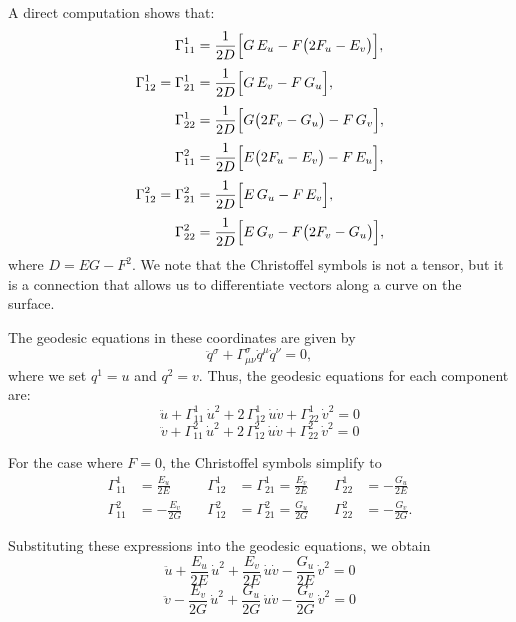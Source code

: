 \documentclass[12pt]{article}
\begin{document}
A direct computation shows that:
\[
\begin{aligned}
\Gamma^1_{11} &= \frac{1}{2D}\Bigl[G\,E_u - F\bigl(2F_u - E_v\bigr)\Bigr],\\[1mm]
\Gamma^1_{12} = \Gamma^1_{21} &= \frac{1}{2D}\Bigl[G\,E_v - F\,G_u\Bigr],\\[1mm]
\Gamma^1_{22} &= \frac{1}{2D}\Bigl[G\bigl(2F_v - G_u\bigr) - F\,G_v\Bigr],\\[1mm]
\Gamma^2_{11} &= \frac{1}{2D}\Bigl[E\bigl(2F_u - E_v\bigr) - F\,E_u\Bigr],\\[1mm]
\Gamma^2_{12} = \Gamma^2_{21} &= \frac{1}{2D}\Bigl[E\,G_u - F\,E_v\Bigr],\\[1mm]
\Gamma^2_{22} &= \frac{1}{2D}\Bigl[E\,G_v - F\bigl(2F_v - G_u\bigr)\Bigr],
\end{aligned}
\]
where \(D = EG - F^2\).
We note that the Christoffel symbols is not a tensor, but it is a connection that allows us to differentiate vectors along a curve on the surface.

The geodesic equations in these coordinates are given by
\[
\ddot{q}^{\sigma} + \Gamma_{\mu\nu}^{\sigma} \dot{q}^{\mu} \dot{q}^{\nu} = 0,
\]
where we set \(q^1=u\) and \(q^2=v\). Thus, the geodesic equations for each component are:
\begin{equation}
    \ddot{u} + \Gamma^1_{11}\,\dot{u}^2 + 2\,\Gamma^1_{12}\,\dot{u}\dot{v} + \Gamma^1_{22}\,\dot{v}^2 = 0
\end{equation}
\begin{equation}
    \ddot{v} + \Gamma^2_{11}\,\dot{u}^2 + 2\,\Gamma^2_{12}\,\dot{u}\dot{v} + \Gamma^2_{22}\,\dot{v}^2 = 0
\end{equation}

For the case where $F = 0$, the Christoffel symbols simplify to
\[
\begin{aligned}
    \Gamma_{11}^{1} &= \frac{E_{u}}{2E} &\quad \Gamma_{12}^{1} &= \Gamma_{21}^{1} = \frac{E_{v}}{2E} &\quad \Gamma_{22}^{1} &= -\frac{G_{u}}{2E} \\[4mm]
    \Gamma_{11}^{2} &= -\frac{E_{v}}{2G} &\quad \Gamma_{12}^{2} &= \Gamma_{21}^{2} = \frac{G_{u}}{2G} &\quad \Gamma_{22}^{2} &= -\frac{G_{v}}{2G}.
\end{aligned}
\]

Substituting these expressions into the geodesic equations, we obtain
\begin{equation}
    \ddot{u} + \frac{E_{u}}{2E}\,\dot{u}^2 + \frac{E_{v}}{2E}\,\dot{u}\dot{v} - \frac{G_{u}}{2E}\,\dot{v}^2 = 0
\end{equation}
\begin{equation}
    \ddot{v} - \frac{E_{v}}{2G}\,\dot{u}^2 + \frac{G_{u}}{2G}\,\dot{u}\dot{v} - \frac{G_{v}}{2G}\,\dot{v}^2 = 0
\end{equation}
\end{document}
